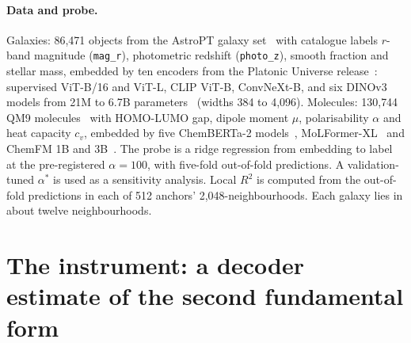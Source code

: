 \documentclass[10pt]{article}
\begin{document}
\paragraph{Data and probe.} Galaxies: 86{,}471 objects from the AstroPT galaxy set~\citep{smith2024astropt} with catalogue labels $r$-band magnitude (\texttt{mag\_r}), photometric redshift (\texttt{photo\_z}), smooth fraction and stellar mass, embedded by ten encoders from the Platonic Universe release~\citep{duraphe2025platonic}: supervised ViT-B/16 and ViT-L, CLIP ViT-B, ConvNeXt-B, and six DINOv3 models from 21M to 6.7B parameters~\citep{simeoni2025dinov3} (widths 384 to 4{,}096). Molecules: 130{,}744 QM9 molecules~\citep{ramakrishnan2014qm9} with HOMO-LUMO gap, dipole moment $\mu$, polarisability $\alpha$ and heat capacity $c_v$, embedded by five ChemBERTa-2 models~\citep{ahmad2022chemberta2}, MoLFormer-XL~\citep{ross2022molformer} and ChemFM 1B and 3B~\citep{cai2024chemfm}. The probe is a ridge regression from embedding to label at the pre-registered $\alpha=100$, with five-fold out-of-fold predictions. A validation-tuned $\alpha^*$ is used as a sensitivity analysis. Local $R^2$ is computed from the out-of-fold predictions in each of 512 anchors' 2{,}048-neighbourhoods. Each galaxy lies in about twelve neighbourhoods. %

\section{The instrument: a decoder estimate of the second fundamental form}
\label{sec:instr}
\end{document}

